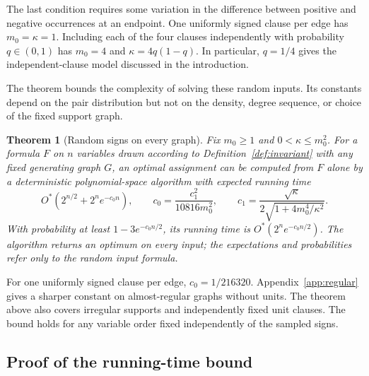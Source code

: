 \documentclass[11pt,a4paper]{article}
\newtheorem{theorem}{Theorem}[section]
\theoremstyle{definition}
\theoremstyle{remark}
\newcommand{\Ostar}{O^{*}}
\begin{document}
The last condition requires some variation in the difference between
positive and negative occurrences at an endpoint. One uniformly signed
clause per edge has $m_0=\kappa=1$. Including each of the four clauses
independently with probability $q\in(0,1)$ has $m_0=4$ and
$\kappa=4q(1-q)$. In particular, $q=1/4$ gives the independent-clause
model discussed in the introduction.

The theorem bounds the complexity of solving these random inputs.
Its constants depend on the pair distribution but not on the density,
degree sequence, or choice of the fixed support graph.

\begin{theorem}[Random signs on every graph]\label{thm:weighted}
Fix $m_0\ge1$ and $0<\kappa\le m_0^2$. For a formula $F$ on $n$ variables drawn
according to Definition~\ref{def:invariant} with any fixed generating
graph $G$, an optimal assignment can be computed from $F$ alone by a
deterministic polynomial-space algorithm with expected running time
\[
 \Ostar(2^{n/2}+2^n e^{-c_0n}),
 \qquad
 c_0=\frac{c_1^2}{10816m_0^2},\qquad
 c_1=\frac{\sqrt\kappa}{2\sqrt{1+4m_0^4/\kappa^2}}.
\]
With probability at least $1-3e^{-c_0n/2}$, its running time is
$\Ostar(2^ne^{-c_0n/2})$.
The algorithm returns an optimum on every input; the expectations and
probabilities refer only to the random input formula.
\end{theorem}

For one uniformly signed clause per edge, $c_0=1/216320$.
Appendix~\ref{app:regular} gives a sharper constant on almost-regular
graphs without units. The theorem above also covers irregular supports
and independently fixed unit clauses. The bound holds for any variable
order fixed independently of the sampled signs.

\subsection{Proof of the running-time bound}
\end{document}
